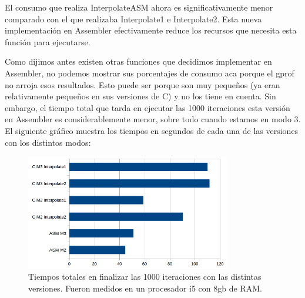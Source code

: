 \documentclass[a4paper]{article}
\begin{document}
El consumo que realiza InterpolateASM ahora es significativamente menor comparado con el que realizaba Interpolate1 e Interpolate2. Esta nueva implementación en Assembler efectivamente reduce los recursos que necesita esta función para ejecutarse.

Como dijimos antes existen otras funciones que decidimos implementar en Assembler, no podemos mostrar sus porcentajes de consumo aca porque el gprof no arroja esos resultados. Esto puede ser porque son muy pequeños (ya eran relativamente pequeños en sus versiones de C) y no los tiene en cuenta. Sin embargo, el tiempo total que tarda en ejecutar las 1000 iteraciones esta versión en Assembler es considerablemente menor, sobre todo cuando estamos en modo 3. El siguiente gráfico muestra los tiempos en segundos de cada una de las versiones con los distintos modos:

\begin{figure}[H]
    \centering
    \includegraphics[width=0.8\textwidth]{Imagenes/tiemposTotales.png}
    \caption{Tiempos totales en finalizar las 1000 iteraciones con las distintas versiones. Fueron medidos en un procesador i5 con 8gb de RAM.}
    \label{fig:mesh1}
\end{figure}
\end{document}
